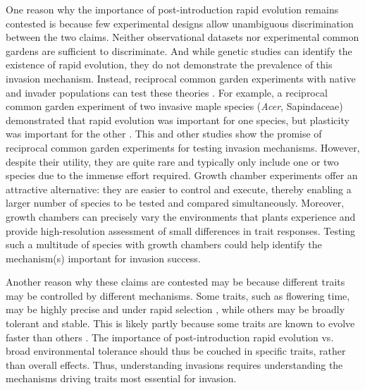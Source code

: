 \documentclass[12pt]{article}\usepackage[]{graphicx}\usepackage[]{color}
\begin{document}
	One reason why the importance of post-introduction rapid evolution remains contested is because few experimental designs allow unambiguous discrimination between the two claims. Neither observational datasets \parencite[e.g.,][]{Wolkovich2013} nor experimental common gardens \parencite{Conner2004,Vitasse2009} are sufficient to discriminate. And while genetic studies can identify the existence of rapid evolution, they do not demonstrate the prevalence of this invasion mechanism. Instead, reciprocal common garden experiments with native and invader populations can test these theories \parencite[e.g.,][]{Lamarque2015,Williams2008}. For example, a reciprocal common garden experiment of two invasive maple species (\textit{Acer}, Sapindaceae) demonstrated that rapid evolution was important for one species, but plasticity was important for the other \parencite{Lamarque2015}.  This and other studies show the promise of reciprocal common garden experiments for testing invasion mechanisms. However, despite their utility, they are quite rare and typically only include one or two species due to the immense effort required. Growth chamber experiments offer an attractive alternative: they are easier to control and execute, thereby enabling a larger number of species to be tested and compared simultaneously. Moreover, growth chambers can precisely vary the environments that plants experience and provide high-resolution assessment of small differences in trait responses. Testing such a multitude of species with growth chambers could help identify the mechanism(s) important for invasion success.  
	
	Another reason why these claims are contested may be because different traits may be controlled by different mechanisms. Some traits, such as flowering time, may be highly precise and under rapid selection \parencite{Weber1998}, while others may be broadly tolerant and stable. This is likely partly because some traits are known to evolve faster than others \parencite{Weiss-Lehman2017}. The importance of post-introduction rapid evolution vs. broad environmental tolerance should thus be couched in specific traits, rather than overall effects. Thus,  understanding invasions requires understanding the mechanisms driving traits most essential for invasion.
	
\end{document}
